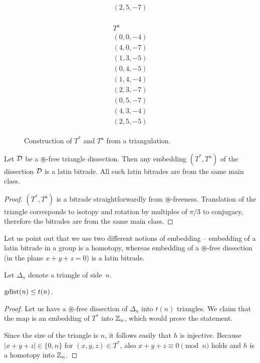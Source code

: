 \begin{exmp}
\begin{figure}[htb]
\begin{minipage}{.16\linewidth}
\begin{align*}
\begin{array}{c}
				(2,5,-7)
			\end{array}
		\end{align*}
	\end{minipage}
	\hspace{.04\linewidth}
	\begin{minipage}{.16\linewidth}
		\begin{align*}
			\begin{array}{c}
				T^\vartriangle \\ \hline
				(0,0,-4) \\
				(4,0,-7) \\
				(1,3,-5) \\
				(0,4,-5) \\
				(1,4,-4) \\
				(2,3,-7) \\
				(0,5,-7) \\
				(4,3,-4) \\
				(2,5,-5)
			\end{array}
		\end{align*}
	\end{minipage}
	\caption{Construction of $T^*$ and $T^\vartriangle$ from a triangulation.}
	\label{fig:arrows}
\end{figure}
\end{exmp}%

\begin{lem}
\label{lem:embedding-bitrade-main-class}
Let $\mathcal D$ be a $\circledast$-free triangle dissection. Then any embedding $(T^*, T^\vartriangle)$ of the dissection $\mathcal D$ is a latin bitrade. All such latin bitrades are from the same main class.
\end{lem}
\begin{proof}
 $(T^*, T^\vartriangle)$ is a bitrade straightforwardly from $\circledast$-freeness. Translation of the triangle corresponds to isotopy and rotation by multiples of $\pi/3$ to conjugacy, therefore the bitrades are from the same main class.
\end{proof}

Let us point out that we use two different notions of embedding -- embedding of a latin bitrade in a group is a homotopy, whereas embedding of a $\circledast$-free dissection (in the plane $x+y+z=0$) is a latin bitrade. 

Let $\Delta_n$ denote a triangle of side~$n$.

\begin{lem}
\label{lem:gdist-leq-tn}
$\mathop{\mathrm{gdist}}(n) \leq t(n)$.
\end{lem}
\begin{proof}
Let us have a $\circledast$-free dissection of $\Delta_n$ into $t(n)$ triangles. We claim that the map
%
is an embedding of $T^*$ into $\mathbb Z_n$, which would prove the statement.

Since the size of the triangle is $n$, it follows easily that $h$ is injective. Because $|x+y+z| \in \{0,n\}$ for $(x,y,z)\in T^*$, also $x+y+z \equiv 0 \pmod n$ holds and $h$ is a homotopy into $\mathbb Z_n$.
\end{proof}

